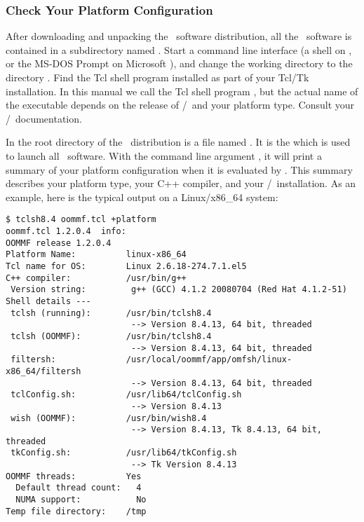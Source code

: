 \subsubsection{Check Your Platform Configuration}

After downloading and unpacking the \OOMMF\ software distribution, all
the \OOMMF\ software is contained in a subdirectory named .
Start a command line interface (a shell on \Unix, or the MS-DOS Prompt 
on Microsoft \Windows), and change the 
working directory to the 
directory .  
Find the Tcl shell program installed as part of your Tcl/Tk 
installation.  In this manual we call the Tcl shell program
, but the actual name of the executable depends
on the release of \Tcl/\Tk\ and your platform type.  Consult
your \Tcl/\Tk\ documentation.

In the root directory of the \OOMMF\ distribution is a file
named .  It is the 
which is used to launch all \OOMMF\ software.  With the command line
argument , 
it will print a summary of your
platform configuration when it is evaluated by .
This summary describes your platform type, your C++ compiler,
and your \Tcl/\Tk\ installation.  As an example, 
here is the typical output on a Linux/x86\_64 system:
\begin{verbatim}
$ tclsh8.4 oommf.tcl +platform
oommf.tcl 1.2.0.4  info:
OOMMF release 1.2.0.4
Platform Name:          linux-x86_64
Tcl name for OS:        Linux 2.6.18-274.7.1.el5
C++ compiler:           /usr/bin/g++ 
 Version string:         g++ (GCC) 4.1.2 20080704 (Red Hat 4.1.2-51)
Shell details ---
 tclsh (running):       /usr/bin/tclsh8.4
                         --> Version 8.4.13, 64 bit, threaded
 tclsh (OOMMF):         /usr/bin/tclsh8.4
                         --> Version 8.4.13, 64 bit, threaded
 filtersh:              /usr/local/oommf/app/omfsh/linux-x86_64/filtersh
                         --> Version 8.4.13, 64 bit, threaded
 tclConfig.sh:          /usr/lib64/tclConfig.sh
                         --> Version 8.4.13
 wish (OOMMF):          /usr/bin/wish8.4
                         --> Version 8.4.13, Tk 8.4.13, 64 bit, threaded
 tkConfig.sh:           /usr/lib64/tkConfig.sh
                         --> Tk Version 8.4.13
OOMMF threads:          Yes
  Default thread count:   4
  NUMA support:           No
Temp file directory:    /tmp
\end{verbatim}

